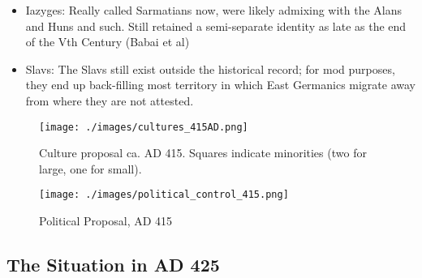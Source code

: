 \documentclass{article}
\begin{document}
\begin{itemize}
		\item Iazyges:\newline
		Really called Sarmatians now, were likely admixing with the Alans and Huns and such.
		Still retained a semi-separate identity as late as the end of the Vth Century (Babai et al)
		
		\item Slavs:\newline
		The Slavs still exist outside the historical record; for mod purposes, they end up back-filling most territory in which East Germanics migrate away from where they are not attested.
	\end{itemize}
	
	\newpage
	\begin{figure}[h!]
		\centering
		\texttt{[image: ./images/cultures\_415AD.png]}
		\caption{Culture proposal ca. AD 415. Squares indicate minorities (two for large, one for small).}
	\end{figure}
	
	\begin{figure}[h!]
		\centering
		\texttt{[image: ./images/political\_control\_415.png]}
		\caption{Political Proposal, AD 415}
	\end{figure}
	
	\newpage
	
	\subsection{The Situation in AD 425}
	\label{sec:timeline:subsec:425}
	
\end{document}
